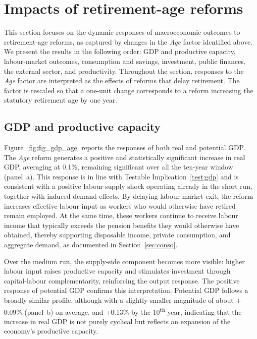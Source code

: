 \documentclass[11pt,english,a4paper, twoside, authoryear]{article}
\begin{document}
\section{Impacts of retirement-age reforms}
\label{sec:results}
This section focuses on the dynamic responses of macroeconomic outcomes to retirement-age reforms, as captured by changes in the \emph{Age} factor identified above. We present the results in the following order: GDP and productive capacity, labour-market outcomes, consumption and savings, investment, public finances, the external sector, and productivity. Throughout the section, responses to the \emph{Age} factor are interpreted as the effects of reforms that delay retirement. The factor is rescaled so that a one-unit change corresponds to a reform increasing the statutory retirement age by one year.


\subsection{GDP and productive capacity}
\label{sec:gdp}

Figure~\ref{fig:fig_gdp_age} reports the responses of both real and potential GDP. The \textit{Age} reform generates a positive and statistically significant increase in real GDP, averaging at 0.1\%, remaining significant over all the ten-year window (panel~a). This response is in line with Testable Implication~\ref{test:gdp} and is consistent with a positive labour-supply shock operating already in the short run, together with induced demand effects. By delaying labour-market exit, the reform increases effective labour input as workers who would otherwise have retired remain employed. At the same time, these workers continue to receive labour income that typically exceeds the pension benefits they would otherwise have obtained, thereby supporting disposable income, private consumption, and aggregate demand, as documented in Section~\ref{sec:conso}. 

Over the medium run, the supply-side component becomes more visible: higher labour input raises productive capacity and stimulates investment through capital-labour complementarity, reinforcing the output response. The positive response of potential GDP confirms this interpretation. Potential GDP follows a broadly similar profile, although with a slightly smaller magnitude of about $+$0.09\% (panel~b) on average, and +0.13\% by the 10\textsuperscript{th} year, indicating that the increase in real GDP is not purely cyclical but reflects an expansion of the economy's productive capacity.
\end{document}
